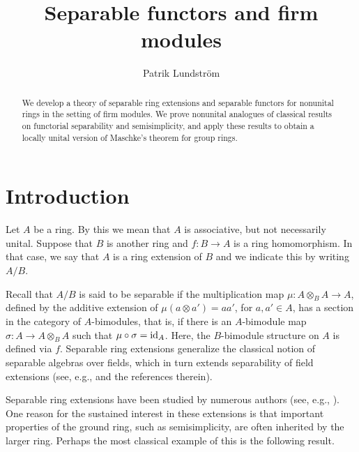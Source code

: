 \documentclass[12pt]{amsart}
\title{Separable functors and firm modules}
\author{Patrik Lundström}
\theoremstyle{definition}
\newcommand{\id}{{\rm id}}
\begin{document}
\begin{abstract}
We develop a theory of separable ring extensions 
and separable functors 
for nonunital rings in the setting of firm modules. 
We prove nonunital analogues of classical results 
on functorial separability 
and semisimplicity, and apply these results 
to obtain a locally unital version 
of Maschke's theorem for group rings.
\end{abstract}


\maketitle



\section{Introduction}\label{sec:introduction}



Let $A$ be a ring. By this we mean that 
$A$ is associative, but not necessarily 
unital.
Suppose that $B$ is another ring and 
$f : B \to A$ is a ring homomorphism.
In that case, we say that $A$ is a 
ring extension of $B$ 
and we indicate this by writing $A/B$.

Recall that $A/B$ 
is said to be separable 
if the multiplication map 
$\mu : A \otimes_B A \to A$, defined by
the additive extension of
$\mu(a \otimes a') = aa'$, for $a,a' \in A$,
has a section in the category of 
$A$-bimodules, that is, if
there is an $A$-bimodule map
$\sigma : A \to A \otimes_B A$ such that
$\mu \circ \sigma = \id_A$. 
Here, the $B$-bimodule structure on $A$
is defined via $f$.
Separable ring extensions generalize the classical notion of 
separable algebras over fields, which in turn extends 
separability of field extensions 
(see, e.g., \cite{wisbauer2016} and the references therein).

Separable ring extensions have been studied
by numerous authors (see, e.g., 
\cite{brzezinski2005,CLP,demeyer1971,
haefner2000,iglesias1998,kadison1999,
lundstrom2005,lundstrom2006,
miyashita1971,
nastasescu1989,nystedt2018,
rafael1990,TheohariApostolidi}).
One reason for the sustained interest in these extensions 
is that important properties of the ground ring,
such as semisimplicity,
are often inherited by the larger ring.
Perhaps the most classical example of this
is the following result.
\end{document}
